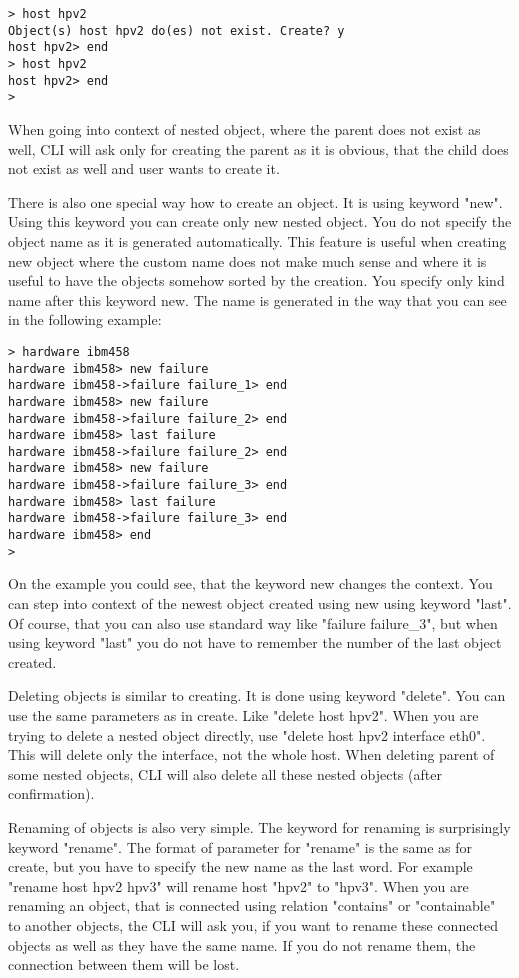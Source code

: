 \documentclass[deska]{subfiles}
\begin{document}
\begin{verbatim}
> host hpv2
Object(s) host hpv2 do(es) not exist. Create? y
host hpv2> end
> host hpv2
host hpv2> end
>
\end{verbatim}

When going into context of nested object, where the parent does not exist as well, CLI will ask only for creating the
parent as it is obvious, that the child does not exist as well and user wants to create it.

There is also one special way how to create an object. It is using keyword "new". Using this keyword you can create only
new nested object. You do not specify the object name as it is generated automatically. This feature is useful when creating
new object where the custom name does not make much sense and where it is useful to have the objects somehow sorted
by the creation. You specify only kind name after this keyword new. The name is generated in the way that you can see in
the following example:

\begin{verbatim}
> hardware ibm458
hardware ibm458> new failure
hardware ibm458->failure failure_1> end
hardware ibm458> new failure
hardware ibm458->failure failure_2> end
hardware ibm458> last failure
hardware ibm458->failure failure_2> end
hardware ibm458> new failure
hardware ibm458->failure failure_3> end
hardware ibm458> last failure
hardware ibm458->failure failure_3> end
hardware ibm458> end
>
\end{verbatim}

On the example you could see, that the keyword new changes the context. You can step into context of the newest object
created using new using keyword "last". Of course, that you can also use standard way like "failure failure\_3", but when
using keyword "last" you do not have to remember the number of the last object created.

Deleting objects is similar to creating. It is done using keyword "delete". You can use the same parameters as in
create. Like "delete host hpv2". When you are trying to delete a nested object directly, use "delete host hpv2 interface
eth0". This will delete only the interface, not the whole host. When deleting parent of some nested objects, CLI will
also delete all these nested objects (after confirmation).

Renaming of objects is also very simple. The keyword for renaming is surprisingly keyword "rename". The format of
parameter for "rename" is the same as for create, but you have to specify the new name as the last word. For example
"rename host hpv2 hpv3" will rename host "hpv2" to "hpv3". When you are renaming an object, that is connected using relation
"contains" or "containable" to another objects, the CLI will ask you, if you want to rename these connected objects
as well as they have the same name. If you do not rename them, the connection between them will be lost.
\end{document}
